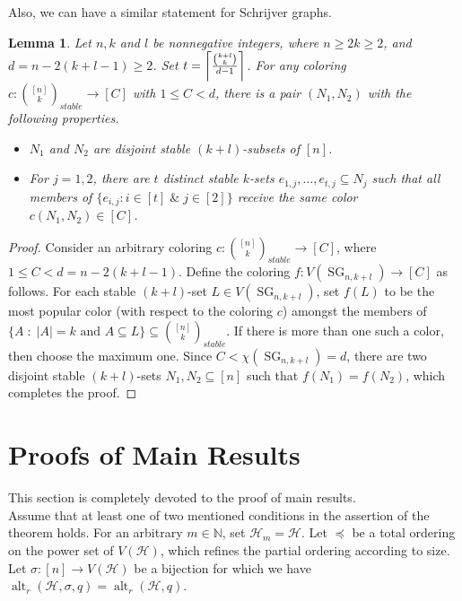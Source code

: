 \documentclass[11pt]{amsart}
\newtheorem{lemma}{Lemma}
\theoremstyle{definition}
\theoremstyle{remark}
\def\SG{\operatorname{SG}}
\def\alt{\operatorname{alt}}
\begin{document}
Also, we can have a similar statement for Schrijver graphs.
\begin{lemma}\label{SGlemma}
Let $n, k$ and $l$ be nonnegative integers, where  $n\geq 2 k\geq 2$, and 
$d= n-2(k+l-1)\geq 2$.  Set $t=\left\lceil{{k+l\choose k}\over d-1}\right\rceil$.
For any coloring  $c:{[n]\choose k}_{stable}\longrightarrow [C]$ with 
$1\leq C<d$, there 
is a pair $(N_1,N_2)$ with the following properties.
\begin{itemize}
\item $N_1$ and $N_2$ are disjoint stable $(k+l)$-subsets of $[n]$. 
\item For $j=1,2$, there are $t$ distinct stable $k$-sets 
$e_{1,j},\ldots,e_{t,j}\subseteq N_j$ such 
that all members of $\{e_{i,j}:i\in[t]\;\&\; j\in[2]\}$ receive the same color $c(N_1,N_2)\in[C]$.
\end{itemize}
\end{lemma}
\begin{proof}
Consider an arbitrary coloring $c:{[n]\choose k}_{stable}\longrightarrow [C]$, where 
$1\leq C<d=n-2(k+l-1)$. 
Define the coloring $f:V(\SG_{n,k+l})\longrightarrow [C]$ as follows. 
For each stable $(k+l)$-set $L\in V(\SG_{n,k+l})$, set $f(L)$ to be the  
most popular color (with respect to the coloring $c$) amongst the members 
of $\{A\;:\; |A|=k \mbox{ and } A\subseteq L\}\subseteq {[n]\choose k}_{stable}$. 
If there is more than one such a color, then choose the maximum one. 
Since $C<\chi(\SG_{n,k+l})=d$, there are two disjoint stable $(k+l)$-sets $N_1,N_2\subseteq [n]$ such that $f(N_1)=f(N_2)$, which completes the proof.
\end{proof}


\section{Proofs of Main Results}\label{proofs}
This section is completely devoted to the proof of main results. \\

Assume that at least one of two mentioned conditions in the assertion of the theorem holds.
For an arbitrary $m\in\mathbb{N}$, set $\mathcal{H}_m=\mathcal{H}$.
Let $\preceq$ be a total ordering on the power set 
of $V(\mathcal{H})$, which refines the partial ordering according to size. Let 
$\sigma:[n]\longrightarrow V(\mathcal{H})$ be a bijection for which we have
$\alt_r(\mathcal{H},\sigma,q)=\alt_r(\mathcal{H},q)$.\\
\end{document}
